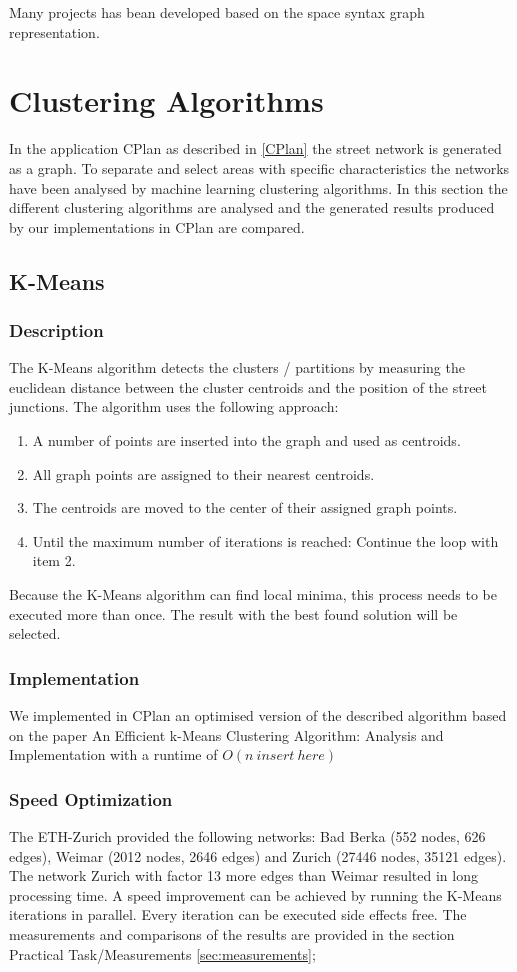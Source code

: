 \documentclass[11pt, a4paper]{report}
\begin{document}
Many projects has bean developed based on the space syntax graph representation. 

\pagebreak
\section{Clustering Algorithms}
In the application CPlan as described in \ref{CPlan} the street network is generated as a graph. To separate and select areas with specific characteristics the networks have been analysed by machine learning clustering algorithms. In this section the different clustering algorithms are analysed and the generated results produced by our implementations in CPlan are compared.
\subsection{K-Means}
\subsubsection{Description}
The K-Means algorithm detects the clusters / partitions by measuring the euclidean distance between the cluster centroids and the position of the street junctions. The algorithm uses the following approach:

\begin{enumerate}
    \item A number of points are inserted into the graph and used as centroids.
    \item All graph points are assigned to their nearest centroids.
    \item The centroids are moved to the center of their assigned graph points.
    \item Until the maximum number of iterations is reached: Continue the loop with item 2.
\end{enumerate}
Because the K-Means algorithm can find local minima, this process needs to be executed more than once. The result with the best found solution will be selected.

\subsubsection{Implementation}
We implemented in CPlan\citep{cPlan:2015} an optimised version of the described algorithm based on the paper An Efficient k-Means Clustering Algorithm: Analysis and Implementation \cite{kmeans:2002} with a runtime of $O(n\ insert\ here)$

\subsubsection{Speed Optimization}
The ETH-Zurich provided the following networks: Bad Berka (552 nodes, 626 edges), Weimar (2012 nodes, 2646 edges) and Zurich (27446 nodes, 35121 edges). The network Zurich with factor 13 more edges than Weimar resulted in long processing time. A speed improvement can be achieved by running the K-Means iterations in parallel. Every iteration can be executed side effects free. The measurements and comparisons of the results are provided in the section Practical Task/Measurements \ref{sec:measurements};
\end{document}
